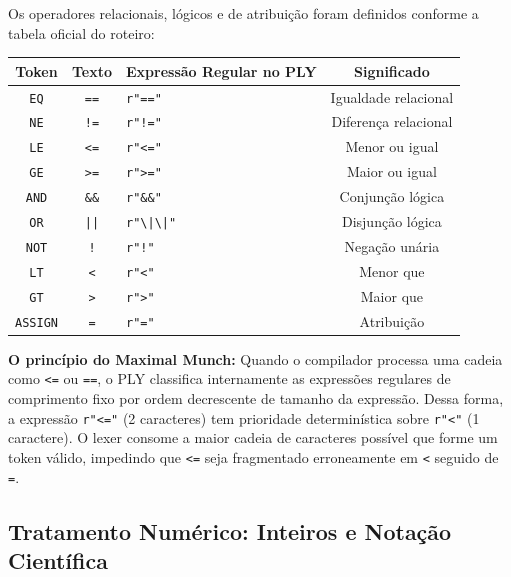 \documentclass[12pt,a4paper]{article}
\begin{document}
Os operadores relacionais, lógicos e de atribuição foram definidos conforme a tabela
oficial do roteiro:

\begin{center}
\begin{tabular}{cclc}
\toprule
\textbf{Token} & \textbf{Texto} & \textbf{Expressão Regular no PLY} & \textbf{Significado} \\
\midrule
\texttt{EQ}     & \texttt{==}  & \texttt{r"=="}                  & Igualdade relacional \\
\texttt{NE}     & \texttt{!=}  & \texttt{r"!="}                  & Diferença relacional \\
\texttt{LE}     & \texttt{<=}  & \texttt{r"<="}                  & Menor ou igual \\
\texttt{GE}     & \texttt{>=}  & \texttt{r">="}                  & Maior ou igual \\
\texttt{AND}    & \texttt{\&\&}& \texttt{r"\&\&"}                & Conjunção lógica \\
\texttt{OR}     & \texttt{||}  & \texttt{r"\textbackslash|\textbackslash|"} & Disjunção lógica \\
\texttt{NOT}    & \texttt{!}   & \texttt{r"!"}                   & Negação unária \\
\texttt{LT}     & \texttt{<}   & \texttt{r"<"}                   & Menor que \\
\texttt{GT}     & \texttt{>}   & \texttt{r">"}                   & Maior que \\
\texttt{ASSIGN} & \texttt{=}   & \texttt{r"="}                   & Atribuição \\
\bottomrule
\end{tabular}
\end{center}

\noindent\textbf{O princípio do Maximal Munch:} Quando o compilador processa uma cadeia
como \texttt{<=} ou \texttt{==}, o PLY classifica internamente as expressões regulares
de comprimento fixo por ordem decrescente de tamanho da expressão. Dessa forma,
a expressão \texttt{r"<="} (2 caracteres) tem prioridade determinística sobre
\texttt{r"<"} (1 caractere). O lexer consome a maior cadeia de caracteres possível que
forme um token válido, impedindo que \texttt{<=} seja fragmentado erroneamente em
\texttt{<} seguido de \texttt{=}.

\subsection{Tratamento Numérico: Inteiros e Notação Científica}
\end{document}
